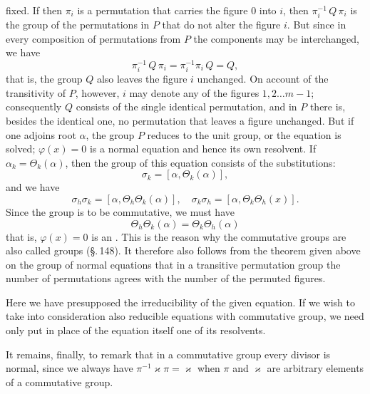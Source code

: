 fixed. If then $\pi_i$ is a permutation that carries the figure 0 into $i$, then $\pi_i^{-1}\,Q\,\pi_i$ is the group of the permutations in $P$ that do not alter the figure $i$. But since in every composition of permutations from $P$ the components may be interchanged, we have
\[
\pi_i^{-1}\,Q\,\pi_i = \pi_i^{-1}\pi_i\,Q = Q,
\]
that is, the group $Q$ also leaves the figure $i$ unchanged. On account of the transitivity of $P$, however, $i$ may denote any of the figures $1,2\ldots m-1$; consequently $Q$ consists of the single identical permutation, and in $P$ there is, besides the identical one, no permutation that leaves a figure unchanged. But if one adjoins  root $\alpha$, the group $P$ reduces to the unit group, or the equation is solved; $\varphi(x)=0$ is a normal equation and hence its own  resolvent. If $\alpha_k=\Theta_k(\alpha)$, then the  group of this equation consists of the substitutions:
\[
\sigma_k = [\alpha,\Theta_k(\alpha)],
\]
and we have
\[
\sigma_h\sigma_k = [\alpha,\Theta_h\Theta_k(\alpha)],\quad \sigma_k\sigma_h = [\alpha,\Theta_k\Theta_h(x)].
\]
Since the group is to be commutative, we must have
\[
\Theta_h\Theta_k(\alpha) = \Theta_k\Theta_h(\alpha)
\]
that is, $\varphi(x)=0$ is an . This is the reason why the commutative groups are also called  groups (\S.\,148). It therefore also follows from the theorem given above on the group of normal equations that in a transitive  permutation group the number of permutations agrees with the number of the permuted figures.

Here we have presupposed the irreducibility of the given equation. If we wish to take into consideration also reducible equations with commutative group, we need only put in place of the equation itself one of its  resolvents.

It remains, finally, to remark that in a commutative group every divisor is normal, since we always have $\pi^{-1}\varkappa\pi = \varkappa$ when $\pi$ and $\varkappa$ are arbitrary elements of a commutative group.
